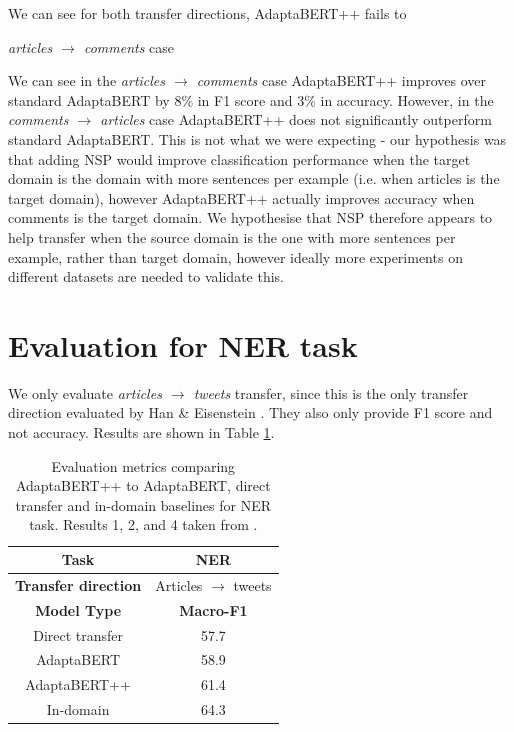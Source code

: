 
We can see for both transfer directions, AdaptaBERT++ fails to 


\textit{articles $ \rightarrow $ comments} case

We can see in the \textit{articles $ \rightarrow $ comments} case AdaptaBERT++ improves over standard AdaptaBERT by 8\% in F1 score and 3\% in accuracy. However, in the \textit{comments $ \rightarrow $ articles} case AdaptaBERT++ does not significantly outperform standard AdaptaBERT. This is not what we were expecting - our hypothesis was that adding NSP would improve classification performance when the target domain is the domain with more sentences per example (i.e. when articles is the target domain), however AdaptaBERT++ actually improves accuracy when comments is the target domain. We hypothesise that NSP therefore appears to help transfer when the source domain is the one with more sentences per example, rather than target domain, however ideally more experiments on different datasets are needed to validate this.

\section{Evaluation for NER task} \label{sec:nsp-evaluation-ner}

We only evaluate \textit{articles $ \rightarrow $ tweets} transfer, since this is the only transfer direction evaluated by Han \& Eisenstein \cite{adaptabert}. They also only provide F1 score and not accuracy. Results are shown in Table \ref{tab:adaptabert-nsp-ner-results}.

\begin{table}[ht]
    \begin{center}
        \begin{tabular}{|c|c|}
            \hline
            \textbf{Task} & NER \\
            \hline
            \textbf{Transfer direction} & Articles $ \rightarrow $ tweets \\
            \hline \hline
            \textbf{Model Type} & \textbf{Macro-F1} \\
            \hline
            Direct transfer & 57.7  \\
            AdaptaBERT & 58.9  \\
            AdaptaBERT++ & 61.4  \\
            \hline
            In-domain & 64.3 \\
            \hline
        \end{tabular}
    \end{center}
    \caption{Evaluation metrics comparing AdaptaBERT++ to AdaptaBERT, direct transfer and in-domain baselines for NER task. Results 1, 2, and 4 taken from \cite{adaptabert}.}
    \label{tab:adaptabert-nsp-ner-results}
\end{table}


